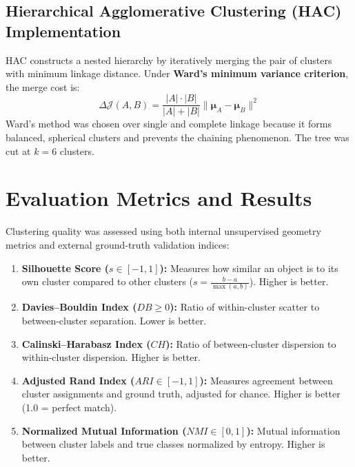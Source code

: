 \documentclass[12pt,a4paper]{article}
\begin{document}
\subsection{Hierarchical Agglomerative Clustering (HAC) Implementation}
HAC constructs a nested hierarchy by iteratively merging the pair of clusters with minimum linkage distance. Under \textbf{Ward's minimum variance criterion}, the merge cost is:
\begin{equation}
\Delta \mathcal{J}(A, B) = \frac{|A| \cdot |B|}{|A| + |B|} \|\boldsymbol{\mu}_A - \boldsymbol{\mu}_B\|^2
\end{equation}
Ward's method was chosen over single and complete linkage because it forms balanced, spherical clusters and prevents the chaining phenomenon. The tree was cut at $k=6$ clusters.

\section{Evaluation Metrics and Results}
Clustering quality was assessed using both internal unsupervised geometry metrics and external ground-truth validation indices:
\begin{enumerate}
\item \textbf{Silhouette Score ($s \in [-1, 1]$):} Measures how similar an object is to its own cluster compared to other clusters ($s = \frac{b - a}{\max(a, b)}$). Higher is better.
\item \textbf{Davies--Bouldin Index ($DB \ge 0$):} Ratio of within-cluster scatter to between-cluster separation. Lower is better.
\item \textbf{Calinski--Harabasz Index ($CH$):} Ratio of between-cluster dispersion to within-cluster dispersion. Higher is better.
\item \textbf{Adjusted Rand Index ($ARI \in [-1, 1]$):} Measures agreement between cluster assignments and ground truth, adjusted for chance. Higher is better (1.0 = perfect match).
\item \textbf{Normalized Mutual Information ($NMI \in [0, 1]$):} Mutual information between cluster labels and true classes normalized by entropy. Higher is better.
\end{enumerate}
\end{document}
